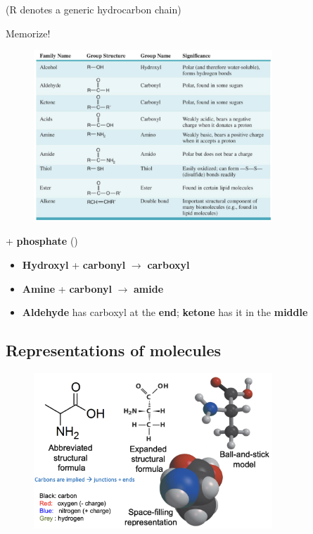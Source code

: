 \documentclass[letterpaper, 12pt]{article}
\begin{document}
(R denotes a generic hydrocarbon chain)

Memorize!

\begin{figure}[H]
\centering
\includegraphics[width=0.8\textwidth]{functionalgroups}
\end{figure}

+ \textbf{phosphate} ()

\begin{itemize}
\item \textbf{Hydroxyl} + \textbf{carbonyl} $\to$ \textbf{carboxyl}
\item \textbf{Amine} + \textbf{carbonyl} $\to$ \textbf{amide}
\item \textbf{Aldehyde} has carboxyl at the \textbf{end}; \textbf{ketone} has it in the \textbf{middle}
\end{itemize}

\subsection*{Representations of molecules}

\begin{figure}[H]
\centering
\includegraphics[width=0.8\textwidth]{models}
\end{figure}
\end{document}
